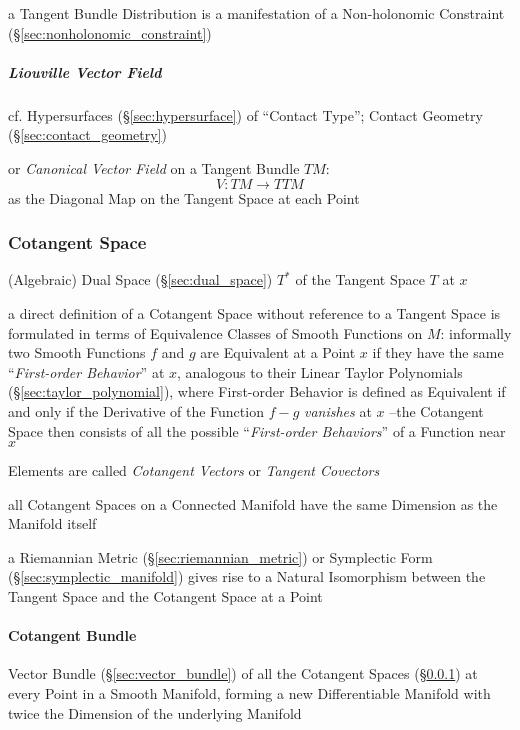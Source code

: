 a Tangent Bundle Distribution is a manifestation of a Non-holonomic Constraint
(\S\ref{sec:nonholonomic_constraint})



\subparagraph{Liouville Vector Field}\label{sec:liouville_vector_field}\hfill

cf. Hypersurfaces (\S\ref{sec:hypersurface}) of ``Contact Type''; \fist Contact
Geometry (\S\ref{sec:contact_geometry})

or \emph{Canonical Vector Field} on a Tangent Bundle $TM$:
\[
  V : TM \rightarrow TTM
\]
as the Diagonal Map on the Tangent Space at each Point



\subsubsection{Cotangent Space}\label{sec:cotangent_space}

(Algebraic) Dual Space (\S\ref{sec:dual_space}) $T^*$ of the Tangent Space $T$
at $x$

a direct definition of a Cotangent Space without reference to a Tangent Space
is formulated in terms of Equivalence Classes of Smooth Functions on $M$:
informally two Smooth Functions $f$ and $g$ are Equivalent at a Point $x$ if
they have the same ``\emph{First-order Behavior}'' at $x$, analogous to their
Linear Taylor Polynomials (\S\ref{sec:taylor_polynomial}), where First-order
Behavior is defined as Equivalent if and only if the Derivative of the Function
$f-g$ \emph{vanishes} at $x$ --the Cotangent Space then consists of all the
possible ``\emph{First-order Behaviors}'' of a Function near $x$

Elements are called \emph{Cotangent Vectors} or \emph{Tangent Covectors}

all Cotangent Spaces on a Connected Manifold have the same Dimension as the
Manifold itself

a Riemannian Metric (\S\ref{sec:riemannian_metric}) or Symplectic Form
(\S\ref{sec:symplectic_manifold}) gives rise to a Natural Isomorphism between
the Tangent Space and the Cotangent Space at a Point



\paragraph{Cotangent Bundle}\label{sec:cotangent_bundle}\hfill

Vector Bundle (\S\ref{sec:vector_bundle}) of all the Cotangent Spaces
(\S\ref{sec:cotangent_space}) at every Point in a Smooth Manifold, forming a
new Differentiable Manifold with twice the Dimension of the underlying Manifold

